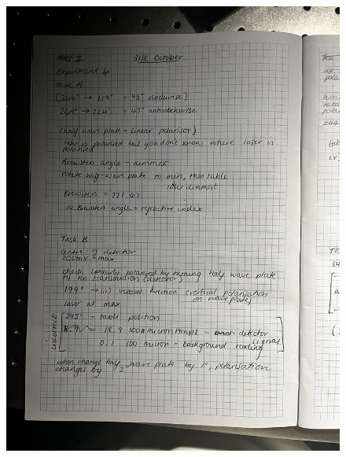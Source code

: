 \documentclass{article}
\begin{document}
\begin{figure}[H]
    \centering
    \includegraphics[width=1.2\textwidth,angle=270,origin=c]{labbook8.jpg}
\end{figure}
\end{document}
